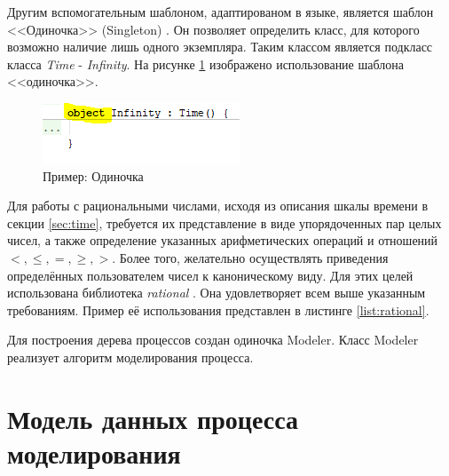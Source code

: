 Другим вспомогательным шаблоном, адаптированом в языке, является шаблон <<Одиночка>> (Singleton) \cite{morton1992object}. 
Он позволяет определить класс, для которого возможно наличие лишь одного экземпляра.
Таким классом является подкласс класса \textit{Time} - \textit{Infinity}.
На рисунке \ref{fig:object} изображено использование шаблона <<одиночка>>.
\begin{figure}[h]
	\centering
	\includegraphics[width=0.4\linewidth]{images/object}
	\caption{Пример: Одиночка}
	\label{fig:object}
\end{figure}
\FloatBarrier

Для работы с рациональными числами, исходя из описания шкалы времени в секции \ref{sec:time}, требуется их представление в виде упорядоченных пар целых чисел, а также определение указанных арифметических операций и отношений $ <, \leq, =, \geq, > $. 
Более того, желательно осуществлять приведения определённых пользователем чисел к каноническому виду. 
Для этих целей использована библиотека \textit{rational} \cite{Fylipp2018rational}.  
Она удовлетворяет всем выше указанным требованиям.
Пример её использования представлен в листинге \ref{list:rational}.



Для построения дерева процессов создан одиночка Modeler. Класс Modeler реализует алгоритм моделирования процесса.

\section{Модель данных процесса моделирования}


